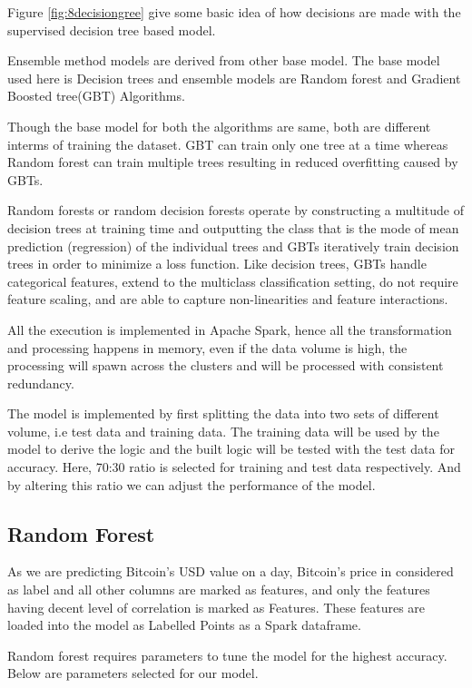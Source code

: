 \documentclass[sigconf]{acmart}
\begin{document}
 

Figure \ref{fig:8decisiongree} give some basic idea of how decisions are made with the supervised decision tree based model.

Ensemble method models are derived from other base model. The base model used here is Decision trees and ensemble models are Random forest and Gradient Boosted tree(GBT) Algorithms.

Though the base model for both the algorithms are same, both are different interms of training the dataset. GBT can train only one tree at a time whereas Random forest can train multiple trees resulting in reduced overfitting caused by GBTs.

Random forests or random decision forests operate by constructing a multitude of decision trees at training time and outputting the class that is the mode of mean prediction (regression) of the individual trees and GBTs iteratively train decision trees in order to minimize a loss function. Like decision trees, GBTs handle categorical features, extend to the multiclass classification setting, do not require feature scaling, and are able to capture non-linearities and feature interactions.

All the execution is implemented in Apache Spark, hence all the transformation and processing happens in memory, even if the data volume is high, the processing will spawn across the clusters and will be processed with consistent redundancy.

The model is implemented by first splitting the data into two sets of different volume, i.e test data and training data. The training data will be used by the model to derive the logic and the built logic will be tested with the test data for accuracy. Here, 70:30 ratio is selected for training and test data respectively. And by altering this ratio we can adjust the performance of the model.

\subsection{Random Forest}
As we are predicting Bitcoin's USD value on a day, Bitcoin's price in considered as label and all other columns are marked as features, and only the features having decent level of correlation is marked as Features. These features are loaded into the model as Labelled Points as a Spark dataframe.

Random forest requires parameters to tune the model for the highest accuracy. Below are parameters selected for our model.
\end{document}
